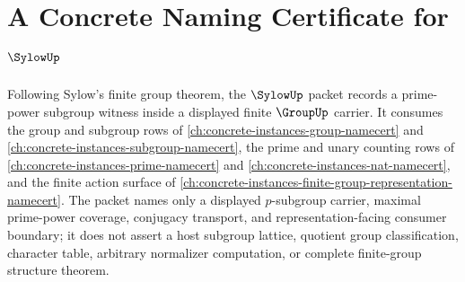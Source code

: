 \chapter{A Concrete Naming Certificate for $\SylowUp$}
\label{ch:concrete-instances-sylow-namecert}

Following Sylow's finite group theorem, the $\SylowUp$ packet records a prime-power subgroup witness inside a displayed finite $\GroupUp$ carrier. It consumes the group and subgroup rows of \autoref{ch:concrete-instances-group-namecert} and \autoref{ch:concrete-instances-subgroup-namecert}, the prime and unary counting rows of \autoref{ch:concrete-instances-prime-namecert} and \autoref{ch:concrete-instances-nat-namecert}, and the finite action surface of \autoref{ch:concrete-instances-finite-group-representation-namecert}. The packet names only a displayed $p$-subgroup carrier, maximal prime-power coverage, conjugacy transport, and representation-facing consumer boundary; it does not assert a host subgroup lattice, quotient group classification, character table, arbitrary normalizer computation, or complete finite-group structure theorem.


